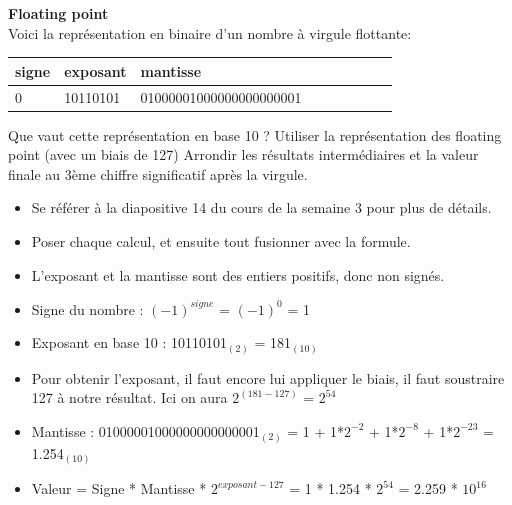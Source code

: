 \begin{Exercice}[10 minutes] \textbf{Floating point}\\
    
    Voici la représentation en binaire d'un nombre à virgule flottante: \\
    
     \begin{tabular}{| p{1cm} | p{3cm} | p{9.5cm} | p{1cm} | p{1cm} | p{1cm} | p{1cm} | p{1cm} | p{1cm} |} 
            \hline
            signe & exposant & mantisse \\ [0.5ex] 
            \hline
            0 & 10110101 & 01000001000000000000001 \\ [0.5ex]
            \hline
	\end{tabular}
	
    Que vaut cette représentation en base 10 ? Utiliser la représentation des floating point (avec un 
    biais de 127) Arrondir les résultats intermédiaires et la valeur finale au 3ème chiffre significatif après la virgule. \\
	
    \begin{conseil}
    
    \begin{itemize}
    	\item Se référer à la diapositive 14 du cours de la semaine 3 pour plus de détails.
    	\item Poser chaque calcul, et ensuite tout fusionner avec la formule.
    	\item L'exposant et la mantisse sont des entiers positifs, donc non signés.
    \end{itemize}
    
    \end{conseil}
    
    \begin{solution}
        \begin{itemize}
        	\item Signe du nombre : $(-1)^{signe}$ = $(-1)^0$ = 1
        	\item Exposant en base 10 : 10110101$_{(2)}$ = 181$_{(10)}$
        	\item Pour obtenir l'exposant, il faut encore lui appliquer le biais, il faut soustraire 127 à notre résultat. Ici on aura $2^{(181-127)}$ = $2^{54}$
        	\item Mantisse : 01000001000000000000001$_{(2)}$ = 1 + 1*$2^{-2}$ + 1*$2^{-8}$ + 1*$2^{-23}$ = 1.254$_{(10)}$
        	\item Valeur = Signe * Mantisse * $2^{exposant-127}$ = 1 * 1.254 * $2^{54}$ = 2.259 * $10^{16}$
        \end{itemize}
    \end{solution}
\end{Exercice}

